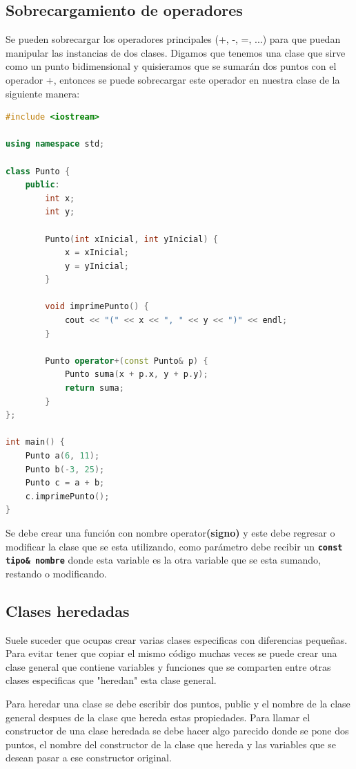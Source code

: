 \documentclass{article}
\begin{document}
\subsection{Sobrecargamiento de operadores}

Se pueden sobrecargar los operadores principales (+, -, =, ...) para que puedan manipular las instancias de dos clases. Digamos que tenemos una clase que sirve como un punto bidimensional y quisieramos que se sumarán dos puntos con el operador +, entonces se puede sobrecargar este operador en nuestra clase de la siguiente manera:

\begin{lstlisting}[language=C++, caption=Sobrecargamiento de operadores]
#include <iostream>

using namespace std;

class Punto {
    public:
        int x;
        int y;

        Punto(int xInicial, int yInicial) {
            x = xInicial;
            y = yInicial;
        }
        
        void imprimePunto() {
            cout << "(" << x << ", " << y << ")" << endl;
        }

        Punto operator+(const Punto& p) {
            Punto suma(x + p.x, y + p.y);
            return suma;
        }
};

int main() {
    Punto a(6, 11);
    Punto b(-3, 25);
    Punto c = a + b;
    c.imprimePunto();
}
\end{lstlisting}

Se debe crear una función con nombre operator\textbf{(signo)} y este debe regresar o modificar la clase que se esta utilizando, como parámetro debe recibir un \textbf{\lstinline{const tipo& nombre}} donde esta variable es la otra variable que se esta sumando, restando o modificando.

\subsection{Clases heredadas}

Suele suceder que ocupas crear varias clases especificas con diferencias pequeñas. Para evitar tener que copiar el mismo código muchas veces se puede crear una clase general que contiene variables y funciones que se comparten entre otras clases especificas que "heredan" esta clase general.

Para heredar una clase se debe escribir dos puntos, public y el nombre de la clase general despues de la clase que hereda estas propiedades. Para llamar el constructor de una clase heredada se debe hacer algo parecido donde se pone dos puntos, el nombre del constructor de la clase que hereda y las variables que se desean pasar a ese constructor original.
\end{document}
